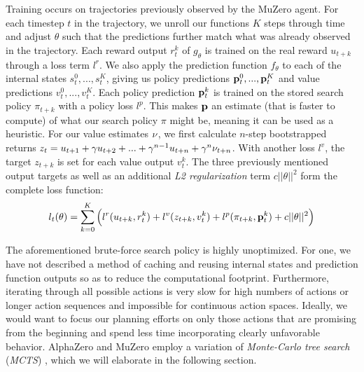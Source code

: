Training occurs on trajectories previously observed by the MuZero agent. For each timestep $t$ in the trajectory, we unroll our functions $K$ steps through time and adjust $\theta$ such that the predictions further match what was already observed in the trajectory. Each reward output $r^k_t$ of $g_\theta$ is trained on the real reward $u_{t+k}$ through a loss term $l^r$. We also apply the prediction function $f_\theta$ to each of the internal states $s^0_t, ..., s^K_t$, giving us policy predictions $\text{\textbf{p}}^0_t, ..., \text{\textbf{p}}^K_t$ and value predictions $v^0_t, ..., v^K_t$. Each policy prediction $\text{\textbf{p}}^k_t$ is trained on the stored search policy $\pi_{t+k}$ with a policy loss $l^p$. This makes $\text{\textbf{p}}$ an estimate (that is faster to compute) of what our search policy $\pi$ might be, meaning it can be used as a heuristic. For our value estimates $\nu$, we first calculate $n$-step bootstrapped returns $z_t = u_{t+1} + \gamma u_{t+2} + ... + \gamma^{n-1} u_{t+n} + \gamma^n\nu_{t+n}$. With another loss $l^v$, the target $z_{t+k}$ is set for each value output $v^k_t$. The three previously mentioned output targets as well as an additional \textit{L2 regularization} term $c||\theta||^2$ \cite{l2-regularization} form the complete loss function:
\begin{equation*}
    l_t(\theta) = \sum^K_{k=0} \left(l^r(u_{t+k}, r_t^k) + l^v(z_{t+k}, v_t^k) + l^p(\pi_{t+k}, \text{\textbf{p}}_t^k) + c||\theta||^2\right)
\end{equation*}

The aforementioned brute-force search policy is highly unoptimized. For one, we have not described a method of caching and reusing internal states and prediction function outputs so as to reduce the computational footprint. Furthermore, iterating through all possible actions is very slow for high numbers of actions or longer action sequences and impossible for continuous action spaces. Ideally, we would want to focus our planning efforts on only those actions that are promising from the beginning and spend less time incorporating clearly unfavorable behavior. AlphaZero and MuZero employ a variation of \textit{Monte-Carlo tree search} (\textit{MCTS}) \cite{mcts}, which we will elaborate in the following section.

